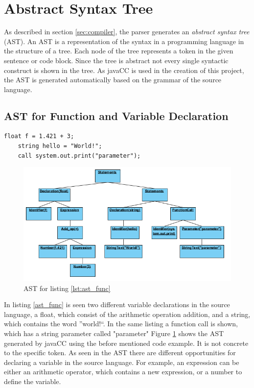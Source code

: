 \section{Abstract Syntax Tree}
\label{sec:AST}
As described in section \ref{sec:compiler}, the parser generates an \textit{abstract syntax tree} (AST). An AST is a representation of the syntax in a programming language in the structure of a tree. Each node of the tree represents a token in the given sentence or code block. Since the tree is abstract not every single syntactic construct is shown in the tree. As javaCC is used in the creation of this project, the AST is generated automatically based on the grammar of the source language.

\subsection{AST for Function and Variable Declaration}
\begin{lstlisting}[caption=Different variable declarations and a function call, label=lst:ast_func]
	float f = 1.421 + 3;
	string hello = "World!";
	call system.out.print("parameter");
\end{lstlisting}
\begin{figure}[H]
	\centering
		\includegraphics[width=\textwidth]{billeder/function_AST.png}
		\caption{AST for listing \ref{lst:ast_func}}
		\label{fig:ast_func}
\end{figure}
In listing \ref{ast_func} is seen two different variable declarations in the source language, a float, which consist of the arithmetic operation addition, and a string, which contains the word ''world!``. In the same listing a function call is shown, which has a string parameter called "parameter" Figure \ref{fig:ast_func} shows the AST generated by javaCC using the before mentioned code example. It is not concrete to the specific token. As seen in the AST there are different opportunities for declaring a variable in the source language. For example, an expression can be either an arithmetic operator, which contains a new expression, or a number to define the variable.

